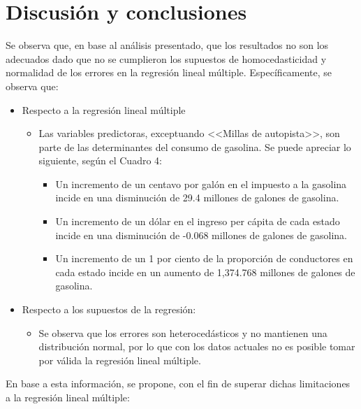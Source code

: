 \documentclass[a4paper,10pt]{article}\usepackage[]{graphicx}\usepackage[]{color}
\begin{document}
\section{Discusión y conclusiones}

Se observa que, en base al análisis presentado, que los resultados no son los adecuados dado que no se cumplieron los supuestos de homocedasticidad y normalidad de los errores en la regresión lineal múltiple. Específicamente, se observa que:
\begin{itemize}
  \item Respecto a la regresión lineal múltiple
      \begin{itemize}
          \item Las variables predictoras, exceptuando <<Millas de autopista>>, son parte de las determinantes del consumo de gasolina. Se puede apreciar lo siguiente, según el Cuadro 4:
              \begin{itemize}
                  \item Un incremento de un centavo por galón en el impuesto a la gasolina incide en una disminución de 29.4 millones de galones de gasolina.
                  \item Un incremento de un dólar en el ingreso per cápita de cada estado incide en una disminución de -0.068 millones de galones de gasolina.
                  \item Un incremento de un 1 por ciento de la proporción de conductores en cada estado incide en un aumento de 1,374.768 millones de galones de gasolina.
            \end{itemize}
      \end{itemize}
  \item Respecto a los supuestos de la regresión:
    \begin{itemize}
      \item Se observa que los errores son heterocedásticos y no mantienen una distribución normal, por lo que con los datos actuales no es posible tomar por válida la regresión lineal múltiple.
    \end{itemize}
\end{itemize}

En base a esta información, se propone, con el fin de superar dichas limitaciones a la regresión lineal múltiple:
\end{document}
